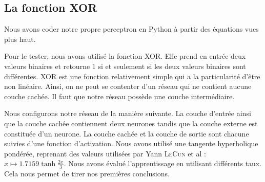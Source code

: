 \subsection{La fonction XOR}

Nous avons coder notre propre perceptron en Python à partir des équations vues plus haut.

Pour le tester, nous avons utilisé la fonction XOR. Elle prend en entrée deux valeurs binaires et retourne 1 si et seulement si les deux valeurs binaires sont différentes. XOR est une fonction relativement simple qui a la particularité d'être non linéaire. Ainsi, on ne peut se contenter d'un réseau qui ne contient aucune couche cachée. Il faut que notre réseau possède une couche intermédiaire.

Nous configurons notre réseau de la manière suivante. La couche d'entrée ainsi que la couche cachée contiennent deux neurones tandis que la couche externe est constituée d'un neurone. La couche cachée et la couche de sortie sont chacune suivies d'une fonction d'activation. Nous avons utilisé une tangente hyperbolique pondérée, reprenant des valeurs utilisées par Yann \textsc{LeCun} et al : $ x \mapsto 1.7159\tanh{\frac{2x}{3}}$. Nous avons évalué l'apprentissage en utilisant différents taux. Cela nous permet de tirer nos premières conclusions.

